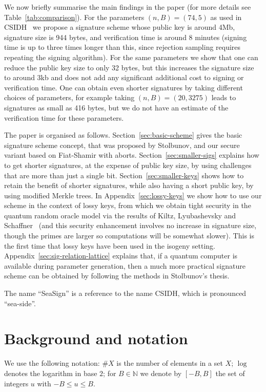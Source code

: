 \documentclass{llncs}
\newcommand{\N}{\mathbb{N}}
\begin{document}
We now briefly summarise the main findings in the paper (for more details see Table~\ref{tab:comparison}).
For the parameters $(n,B) = (74,5)$ as used in CSIDH~\cite{CLMPR18} we propose a signature scheme whose public key is around 4Mb, signature size is 944 bytes, and verification time is around 8 minutes (signing time is up to three times longer than this, since rejection sampling requires repeating the signing algorithm). For the same parameters we show that one can reduce the public key size to only 32 bytes, but this increases the signature size to around 3kb and does not add any significant additional cost to signing or verification time.
One can obtain even shorter signatures by taking different choices of parameters, for example taking $(n,B) = (20,3275)$ leads to signatures as small as 416 bytes, but we do not have an estimate of the verification time for these parameters.


The paper is organised as follows.
Section~\ref{sec:basic-scheme} gives the basic signature scheme concept, that was proposed by Stolbunov, and our secure variant based on Fiat-Shamir with aborts.
Section~\ref{sec:smaller-sigs} explains how to get shorter signatures, at the expense of public key size, by using challenges that are more than just a single bit.
Section~\ref{sec:smaller-keys} shows how to retain the benefit of shorter signatures, while also having a short public key, by using modified Merkle trees.
In Appendix~\ref{sec:lossy-keys} we show how to use our scheme in the context of lossy keys, from which we obtain tight security in the quantum random oracle model via the results of Kiltz, Lyubashevsky and Schaffner~\cite{KLS18} (and this security enhancement involves no increase in signature size, though the primes are larger so computations will be somewhat slower).
This is the first time that lossy keys have been used in the isogeny setting.
Appendix~\ref{sec:sig-relation-lattice} explains that, if a quantum computer is available during parameter generation, then a much more practical signature scheme can be obtained by following the methods in Stolbunov's thesis.


The name ``SeaSign'' is a reference to the name CSIDH, which is pronounced ``sea-side''.




\section{Background and notation}


We use the following notation: 
$\#X$ is the number of elements in a set $X$;
$\log$ denotes the logarithm in base $2$;
for $B \in \N$ we denote by $[-B,B]$ the set of integers $u$ with $-B \le u \le B$.
\end{document}
